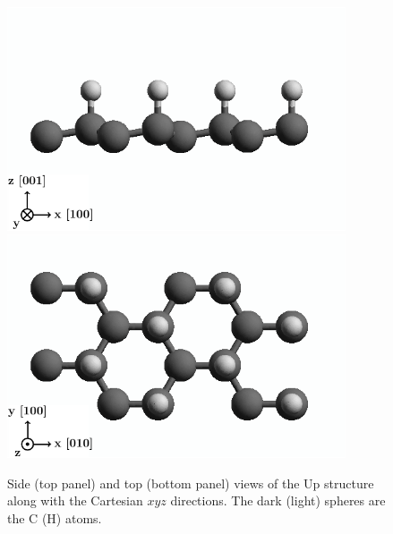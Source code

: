 \documentclass[floatfix,prb,aps,superscriptaddress,showpacs,11pt,preprint,letterpaper]{revtex4}
\def\tama{10cm}
\begin{document}
\begin{figure}[ht!]
    \centering
    \includegraphics[width=\tama]{figures/upstruc2}
    \\
    \includegraphics[width=\tama]{figures/upstruc1}
    \caption{Side (top panel) and top (bottom panel) views of the Up
      structure along with the 
      Cartesian $xyz$ directions. The dark (light) spheres are the C (H) atoms. 
}
    \label{fig:up-struc}
\end{figure}
\end{document}
